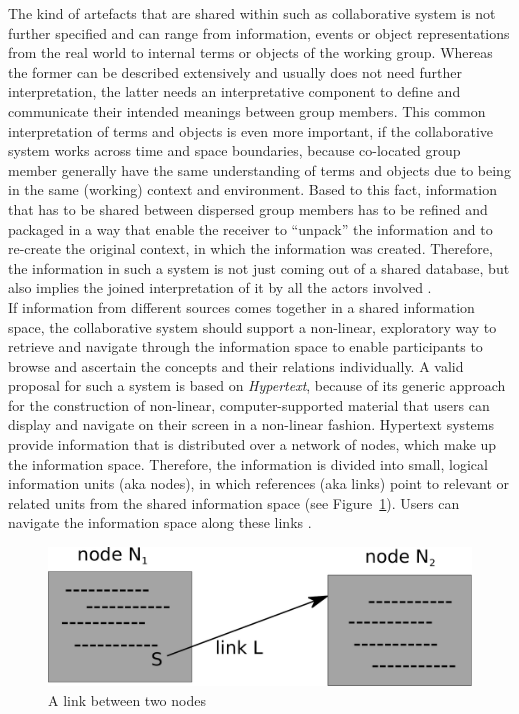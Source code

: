 The kind of artefacts that are shared within such as collaborative system is not further specified and can range from information, events or object representations from the real world to internal terms or objects of the working group. Whereas the former can be described extensively and usually does not need further interpretation, the latter needs an interpretative component to define and communicate their intended meanings between group members. This common interpretation of terms and objects is even more important, if the collaborative system works across time and space boundaries, because co-located group member generally have the same understanding of terms and objects due to being in the same (working) context and environment. Based to this fact, information that has to be shared between dispersed group members has to be refined and packaged in a way that enable the receiver to ``unpack'' the information and to re-create the original context, in which the information was created. Therefore, the information in such a system is not just coming out of a shared database, but also implies the joined interpretation of it by all the actors involved \citep{bannon1997constructing}. \\

If information from different sources comes together in a shared information space, the collaborative system should support a non-linear, exploratory way to retrieve and navigate through the information space to enable participants to browse and ascertain the concepts and their relations individually. A valid proposal for such a system is based on \emph{Hypertext}, because of its generic approach for the construction of non-linear, computer-supported material that users can display and navigate on their screen in a non-linear fashion. Hypertext systems provide information that is distributed over a network of nodes, which make up the information space. Therefore, the information is divided into small, logical information units (aka nodes), in which references (aka links) point to relevant or related units from the shared information space (see Figure~\ref{fig:images_cscw_hypertext_concept}). Users can navigate the information space along these links \citep[pg. 295-307]{borghoff2000computer}. \@

\begin{figure}[H]
  \centering
  \includegraphics[width=0.9\columnwidth]{images/Hypertext.pdf}
  \caption[A link between two nodes]{A link between two nodes \citep[pg. 303]{borghoff2000computer}}
  \label{fig:images_cscw_hypertext_concept}
\end{figure}

